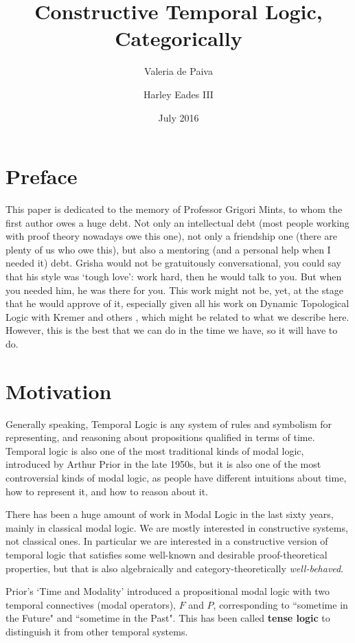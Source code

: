 \documentclass{article}
\title{Constructive Temporal Logic, Categorically}
\author{Valeria de Paiva \and Harley Eades III}
\date{July 2016}
\begin{document}
\maketitle

\section*{Preface}
This paper is dedicated to the memory of Professor Grigori Mints, to whom the first author owes a huge debt. Not only an intellectual debt (most people working with proof theory nowadays owe this one), not only a friendship one (there are plenty of us who owe this), but also a mentoring (and a personal help when I needed it)  debt. Grisha  would not be gratuitously conversational, you could say that his style was `tough love':  work hard, then  he would talk to you. But when you needed him, he was there for you. This work might not be, yet, at the stage that he would approve of it, especially given all his work on Dynamic Topological Logic with Kremer and others \cite{kremer2005}, which might be related to what we describe here. However, this is the best that we can do in the time we have, so it  will have to do. 

\section{Motivation}
Generally speaking, Temporal Logic is any system of rules and
symbolism for representing, and reasoning about propositions qualified
in terms of time.  Temporal logic is also one of the most traditional
kinds of modal logic, introduced by Arthur Prior in the late 1950s,
but it is also one of the most controversial kinds of modal logic, as
people have different intuitions about time, how to represent it, and how to reason about it.

There has been a huge amount of work in Modal Logic in the last sixty
years, mainly in classical modal logic. We are mostly interested
in constructive systems, not classical ones. In particular we are interested in a
constructive version of temporal logic that satisfies some well-known
and desirable proof-theoretical properties, but that is also
algebraically and category-theoretically \textit{well-behaved}.

Prior's `Time and Modality' \cite{prior1957} introduced a propositional modal logic
with two temporal connectives (modal operators), $F$ and $P$,
corresponding to ``sometime in the {F}uture" and ``sometime in the {P}ast". This has been called \textbf{tense logic} to distinguish it from other temporal systems.
\end{document}
